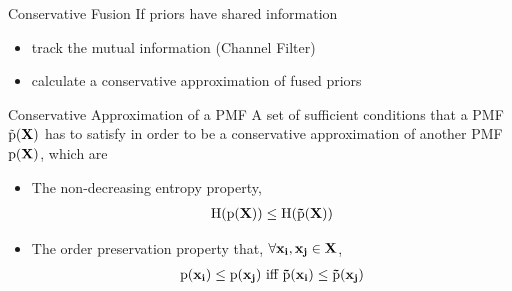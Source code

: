 \documentclass{beamer}
\newcommand{\vect}{\bf}
\theoremstyle{remark}
\newcommand{\pr}{\textrm{p}}
\begin{document}

\begin{frame}{Conservative Fusion}
	If priors have shared information
	\begin{itemize}
		\item {\color{blue}track the mutual information} (Channel Filter)
		\item {\color{blue}calculate a conservative approximation of fused priors}
	\end{itemize}
	\begin{exampleblock}{Conservative Approximation of a PMF}
	A set of sufficient conditions that a PMF $\tilde{\pr}(\vect{X})$ has to satisfy in order to be a conservative approximation of another PMF $\pr(\vect{X})$, which are
	\begin{itemize}
		\item {\color{red}The non-decreasing entropy property},
		$$\begin{aligned}
		\text{H}(\pr(\vect{X})) \leq \text{H}(\tilde{\pr}(\vect{X}))
		\end{aligned}$$
		\item {\color{red}The order preservation property that}, $\forall \vect{x}_i,\vect{x}_j\in\vect{X}$,
		$$\begin{aligned}
		\pr(\vect{x}_i) \leq \pr(\vect{x}_j) \ \text{iff}\  \tilde{\pr}(\vect{x}_i) \leq \tilde{\pr}(\vect{x}_j) 
		\end{aligned}$$
	\end{itemize}
	\end{exampleblock}
\end{frame}
\end{document}
